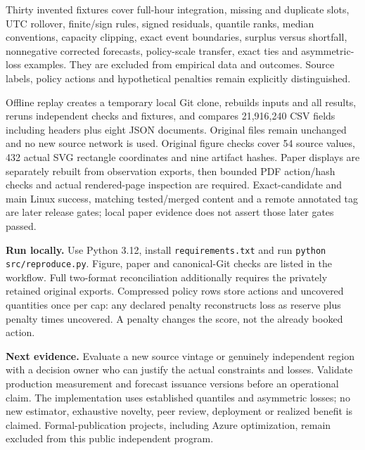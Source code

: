 \documentclass[10pt,letterpaper]{article}
\begin{document}
Thirty invented fixtures cover full-hour integration, missing and duplicate slots, UTC rollover, finite/sign rules, signed residuals, quantile ranks, median conventions, capacity clipping, exact event boundaries, surplus versus shortfall, nonnegative corrected forecasts, policy-scale transfer, exact ties and asymmetric-loss examples. They are excluded from empirical data and outcomes. Source labels, policy actions and hypothetical penalties remain explicitly distinguished.

Offline replay creates a temporary local Git clone, rebuilds inputs and all results, reruns independent checks and fixtures, and compares 21,916,240 CSV fields including headers plus eight JSON documents. Original files remain unchanged and no new source network is used. Original figure checks cover 54 source values, 432 actual SVG rectangle coordinates and nine artifact hashes. Paper displays are separately rebuilt from observation exports, then bounded PDF action/hash checks and actual rendered-page inspection are required. Exact-candidate and main Linux success, matching tested/merged content and a remote annotated tag are later release gates; local paper evidence does not assert those later gates passed.

\textbf{Run locally.} Use Python 3.12, install \texttt{requirements.txt} and run \texttt{python src/reproduce.py}. Figure, paper and canonical-Git checks are listed in the workflow. Full two-format reconciliation additionally requires the privately retained original exports. Compressed policy rows store actions and uncovered quantities once per cap: any declared penalty reconstructs loss as reserve plus penalty times uncovered. A penalty changes the score, not the already booked action.

\textbf{Next evidence.} Evaluate a new source vintage or genuinely independent region with a decision owner who can justify the actual constraints and losses. Validate production measurement and forecast issuance versions before an operational claim. The implementation uses established quantiles and asymmetric losses; no new estimator, exhaustive novelty, peer review, deployment or realized benefit is claimed. Formal-publication projects, including Azure optimization, remain excluded from this public independent program.
\end{document}
